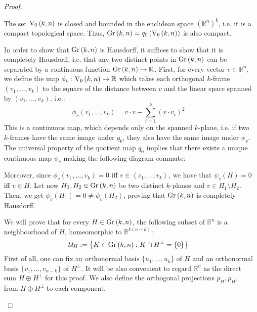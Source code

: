 \begin{proof} \begin{b_item}
\item The set $\StO{k}{n}$ is closed and bounded in the euclidean space $\left(\mathbb{R}^n\right)^k$, i.e. it is a compact topological space. Thus, $\Gr{k}{n}=q_0\left(\StO{k}{n}\right)$ is also compact.
\item In order to show that $\Gr{k}{n}$ is Hausdorff, it suffices to show that it is completely Hausdorff, i.e. that any two distinct points in $\Gr{k}{n}$ can be separated by a continuous function $\Gr{k}{n}\to\mathbb{R}$. First, for every vector $v\in\mathbb{R}^n$, we define the map $\phi_v:\StO{k}{n}\to\mathbb{R}$ which takes each orthogonal $k$-frame $(v_1,\ldots,v_k)$ to the square of the distance between $v$ and the linear space spanned by $(v_1,\ldots,v_k)$, i.e.:
$$\phi_v(v_1,\ldots,v_k)=v\cdot v-\sum_{i=1}^k\left(v\cdot v_i\right)^2$$
This is a continuous map, which depends only on the spanned $k$-plane, i.e. if two $k$-frames have the same image under $q_0$, they also have the same image under $\phi_v$. The universal property of the quotient map $q_0$ implies that there exists a unique continuous map $\psi_v$ making the following diagram commute:
\begin{center}
\end{center}
Moreover, since $\phi_v(v_1,\ldots,v_k)=0$ iff $v\in\left<v_1,\ldots,v_k\right>$, we have that $\psi_v(H)=0$ iff $v\in H$. Let now $H_1,H_2\in\Gr{k}{n}$ be two distinct $k$-planes and $v\in H_1\setminus H_2$. Then, we get $\psi_v(H_1)=0\neq\psi_v(H_2)$, proving that $\Gr{k}{n}$ is completely Hausdorff.


\item We will prove that for every $H\in\Gr{k}{n}$, the following subset of $\mathbb{R}^n$ is a neighboorhood of $H$, homeomorphic to $\mathbb{R}^{k(n-k)}$:
$$\mathcal{U}_H:=\left\{K\in\Gr{k}{n}:K\cap H^{\perp}=\{0\}\right\}$$
First of all, one can fix an orthonormal basis $\{u_1,\ldots,u_k\}$ of $H$ and an orthonormal basis $\{v_1,\ldots,v_{n-k}\}$ of $H^{\perp}$. It will be also convenient to regard $\mathbb{R}^n$ as the direct sum $H\oplus H^{\perp}$ for this proof. We also define the orthogonal projections $p_H,p_{H^{\perp}}$ from $H\oplus H^{\perp}$ to each component.


\end{b_item}
\end{proof}
